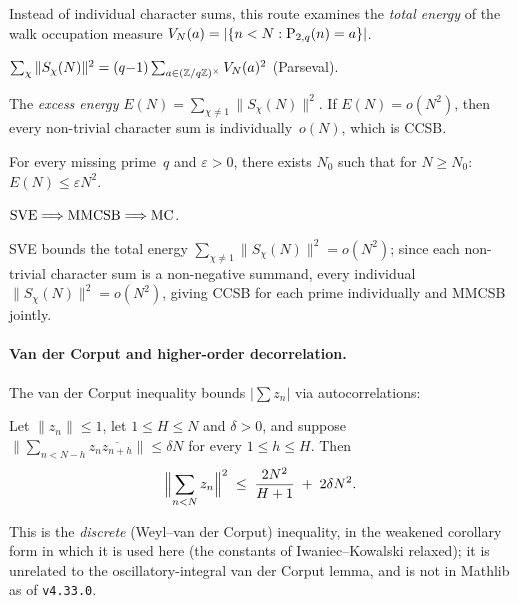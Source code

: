 Instead of individual character sums, this route examines the
\emph{total energy} of the walk occupation measure
$V_N(a) = |\{n < N : \mathrm{P}_{2,q}(n) = a\}|$.

\begin{theorem}
\label{thm:walk-energy}
$\sum_\chi \|S_\chi(N)\|^2 = (q{-}1) \sum_{a \in (\mathbb{Z}/q\mathbb{Z})^\times} V_N(a)^2$
\quad (Parseval).
\end{theorem}

The \emph{excess energy} $E(N) = \sum_{\chi \neq 1} \|S_\chi(N)\|^2$.
If $E(N) = o(N^2)$, then every non-trivial character sum is
individually~$o(N)$, which is CCSB.

\begin{property}
For every missing prime~$q$ and $\varepsilon > 0$, there exists
$N_0$ such that for $N \geq N_0$: $E(N) \leq \varepsilon N^2$.
\end{property}

\begin{theorem}
\label{thm:sve-mc}
$\mathrm{SVE} \Longrightarrow \mathrm{MMCSB} \Longrightarrow \mathrm{MC}$.
\end{theorem}

\noindent SVE bounds the total energy $\sum_{\chi \neq 1} \|S_\chi(N)\|^2
= o(N^2)$; since each non-trivial character sum is a non-negative
summand, every individual $\|S_\chi(N)\|^2 = o(N^2)$, giving CCSB for
each prime individually and MMCSB jointly.

\paragraph{Van der Corput and higher-order decorrelation.}
The van der Corput inequality bounds $|\sum z_n|$ via autocorrelations:

\begin{theorem}
\label{thm:vdc}
Let $\|z_n\| \leq 1$, let $1 \leq H \leq N$ and $\delta > 0$, and suppose
$\bigl\|\sum_{n < N-h} z_n \overline{z_{n+h}}\bigr\| \leq \delta N$ for
every $1 \leq h \leq H$.  Then
\[
  \Bigl\|\sum_{n < N} z_n\Bigr\|^2
  \;\leq\; \frac{2N^2}{H+1} \;+\; 2\delta N^2 .
\]
\end{theorem}

\noindent This is the \emph{discrete} (Weyl--van der Corput) inequality,
in the weakened corollary form in which it is used here (the constants of
Iwaniec--Kowalski relaxed); it is unrelated to the oscillatory-integral
van der Corput lemma, and is not in Mathlib as of \texttt{v4.33.0}.

